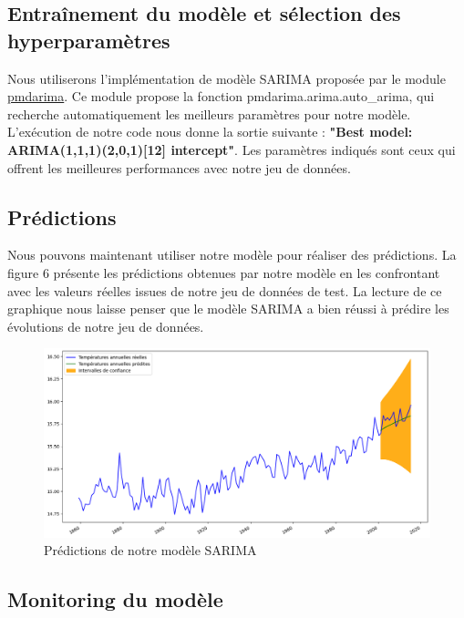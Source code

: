\documentclass[french]{article}
\begin{document}
    \subsection{Entraînement du modèle et sélection des hyperparamètres}

    Nous utiliserons l'implémentation de modèle SARIMA proposée par le module \href{https://pypi.org/project/pmdarima/}{pmdarima}. Ce module propose la fonction pmdarima.arima.auto\_arima, qui recherche automatiquement les meilleurs paramètres pour notre modèle.
    L'exécution de notre code nous donne la sortie suivante : \textbf{"Best model:  ARIMA(1,1,1)(2,0,1)[12] intercept"}. Les paramètres indiqués sont ceux qui offrent les meilleures performances avec notre jeu de données.

    \subsection{Prédictions}

    Nous pouvons maintenant utiliser notre modèle pour réaliser des prédictions. La figure 6 présente les prédictions obtenues par notre modèle en les confrontant avec les valeurs réelles issues de notre jeu de données de test. La lecture de ce graphique nous laisse penser que le modèle SARIMA a bien réussi à prédire les évolutions de notre jeu de données.

    \begin{figure}[h]
        \includegraphics[width=12cm]{forecast}
        \centering
        \caption{Prédictions de notre modèle SARIMA}
        \centering
    \end{figure}

    \subsection{Monitoring du modèle}
    
\end{document}

